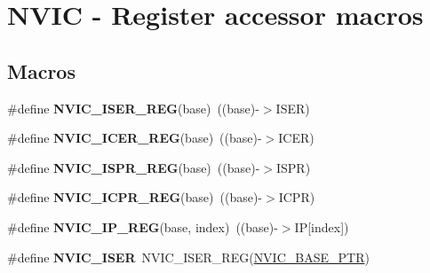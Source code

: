 \hypertarget{group___n_v_i_c___register___accessor___macros}{}\section{N\+V\+IC -\/ Register accessor macros}
\label{group___n_v_i_c___register___accessor___macros}
\subsection*{Macros}
\begin{DoxyCompactItemize}
\item 
\mbox{\label{group___n_v_i_c___register___accessor___macros_gabca9aa3e58e8d296e1ad7663dd9b45d4}} 
\#define {\bfseries N\+V\+I\+C\+\_\+\+I\+S\+E\+R\+\_\+\+R\+EG}(base)~((base)-\/$>$I\+S\+ER)
\item 
\mbox{\label{group___n_v_i_c___register___accessor___macros_gae69fb9df9f1ea893a536d41054c8f035}} 
\#define {\bfseries N\+V\+I\+C\+\_\+\+I\+C\+E\+R\+\_\+\+R\+EG}(base)~((base)-\/$>$I\+C\+ER)
\item 
\mbox{\label{group___n_v_i_c___register___accessor___macros_gafd5a3bbda3cf5a419a054c127f14d5e7}} 
\#define {\bfseries N\+V\+I\+C\+\_\+\+I\+S\+P\+R\+\_\+\+R\+EG}(base)~((base)-\/$>$I\+S\+PR)
\item 
\mbox{\label{group___n_v_i_c___register___accessor___macros_ga22ff82de3e5a13c9cbb49bfd12e4f845}} 
\#define {\bfseries N\+V\+I\+C\+\_\+\+I\+C\+P\+R\+\_\+\+R\+EG}(base)~((base)-\/$>$I\+C\+PR)
\item 
\mbox{\label{group___n_v_i_c___register___accessor___macros_gab650200327187b4594896adc6e6e1d53}} 
\#define {\bfseries N\+V\+I\+C\+\_\+\+I\+P\+\_\+\+R\+EG}(base,  index)~((base)-\/$>$IP\mbox{[}index\mbox{]})
\item 
\mbox{\label{group___n_v_i_c___register___accessor___macros_ga92dfdc731185ed7507e681aa6f7d3f7e}} 
\#define {\bfseries N\+V\+I\+C\+\_\+\+I\+S\+ER}~N\+V\+I\+C\+\_\+\+I\+S\+E\+R\+\_\+\+R\+EG(\hyperlink{group___n_v_i_c___peripheral_ga28f0a055d0c218e16d1fc7b13ff0caa5}{N\+V\+I\+C\+\_\+\+B\+A\+S\+E\+\_\+\+P\+TR})

\end{DoxyCompactItemize}
